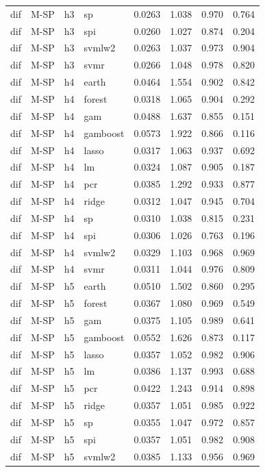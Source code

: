 \begin{ThreePartTable}
\begin{longtable}[t]{llclcccc}
dif & M-SP & h3 & sp & 0.0263 & 1.038 & 0.970 & 0.764\\
dif & M-SP & h3 & spi & 0.0260 & 1.027 & 0.874 & 0.204\\
dif & M-SP & h3 & svmlw2 & 0.0263 & 1.037 & 0.973 & 0.904\\
dif & M-SP & h3 & svmr & 0.0266 & 1.048 & 0.978 & 0.820\\
\addlinespace
dif & M-SP & h4 & earth & 0.0464 & 1.554 & 0.902 & 0.842\\
dif & M-SP & h4 & forest & 0.0318 & 1.065 & 0.904 & 0.292\\
dif & M-SP & h4 & gam & 0.0488 & 1.637 & 0.855 & 0.151\\
dif & M-SP & h4 & gamboost & 0.0573 & 1.922 & 0.866 & 0.116\\
dif & M-SP & h4 & lasso & 0.0317 & 1.063 & 0.937 & 0.692\\
dif & M-SP & h4 & lm & 0.0324 & 1.087 & 0.905 & 0.187\\
dif & M-SP & h4 & pcr & 0.0385 & 1.292 & 0.933 & 0.877\\
dif & M-SP & h4 & ridge & 0.0312 & 1.047 & 0.945 & 0.704\\
dif & M-SP & h4 & sp & 0.0310 & 1.038 & 0.815 & 0.231\\
dif & M-SP & h4 & spi & 0.0306 & 1.026 & 0.763 & 0.196\\
dif & M-SP & h4 & svmlw2 & 0.0329 & 1.103 & 0.968 & 0.969\\
dif & M-SP & h4 & svmr & 0.0311 & 1.044 & 0.976 & 0.809\\
\addlinespace
dif & M-SP & h5 & earth & 0.0510 & 1.502 & 0.860 & 0.295\\
dif & M-SP & h5 & forest & 0.0367 & 1.080 & 0.969 & 0.549\\
dif & M-SP & h5 & gam & 0.0375 & 1.105 & 0.989 & 0.641\\
dif & M-SP & h5 & gamboost & 0.0552 & 1.626 & 0.873 & 0.117\\
dif & M-SP & h5 & lasso & 0.0357 & 1.052 & 0.982 & 0.906\\
dif & M-SP & h5 & lm & 0.0386 & 1.137 & 0.993 & 0.688\\
dif & M-SP & h5 & pcr & 0.0422 & 1.243 & 0.914 & 0.898\\
dif & M-SP & h5 & ridge & 0.0357 & 1.051 & 0.985 & 0.922\\
dif & M-SP & h5 & sp & 0.0355 & 1.047 & 0.972 & 0.857\\
dif & M-SP & h5 & spi & 0.0357 & 1.051 & 0.982 & 0.908\\
dif & M-SP & h5 & svmlw2 & 0.0385 & 1.133 & 0.956 & 0.969\\

\end{longtable}
\end{ThreePartTable}
